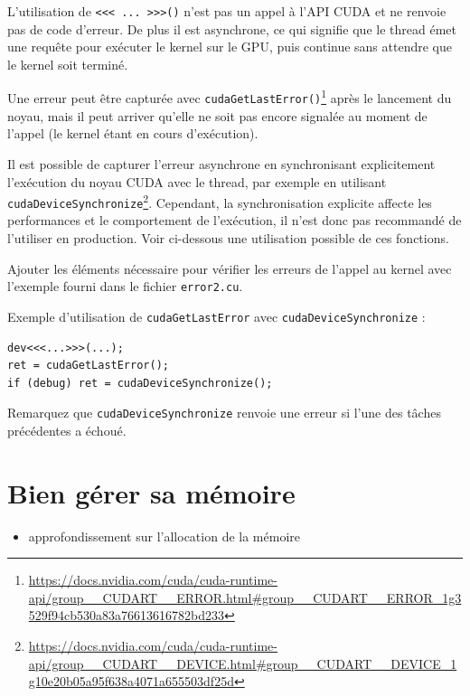 \begin{wtodo}{}

L'utilisation de {\tt {<}{<}< ... {>}{>}>()} n'est pas un appel à l'API CUDA et ne renvoie pas de code d'erreur.
De plus il est asynchrone, ce qui signifie que le thread émet une requête pour exécuter le kernel sur le GPU, puis continue sans attendre que le kernel soit terminé.

Une erreur peut être capturée avec {\tt cudaGetLastError()}\footnote{\url{https://docs.nvidia.com/cuda/cuda-runtime-api/group\_\_CUDART\_\_ERROR.html\#group\_\_CUDART\_\_ERROR\_1g3529f94cb530a83a76613616782bd233}} après le lancement du noyau, mais il peut arriver qu'elle ne soit pas encore signalée au moment de l'appel (le kernel étant en cours d'exécution).

Il est possible de capturer l'erreur asynchrone en synchronisant explicitement l'exécution du noyau CUDA avec le thread, par exemple en utilisant {\tt cudaDeviceSynchronize}\footnote{\url{https://docs.nvidia.com/cuda/cuda-runtime-api/group\_\_CUDART\_\_DEVICE.html\#group\_\_CUDART\_\_DEVICE\_1g10e20b05a95f638a4071a655503df25d}}. Cependant, la synchronisation explicite affecte les performances et le comportement de l'exécution, il n'est donc pas recommandé de l'utiliser en production. Voir ci-dessous une utilisation possible de ces fonctions.

Ajouter les éléments nécessaire pour vérifier les erreurs de l'appel au kernel avec l'exemple fourni dans le fichier {\tt error2.cu}.

\end{wtodo}

\begin{howto}{}
Exemple d'utilisation de {\tt cudaGetLastError} avec {\tt cudaDeviceSynchronize} :
\begin{verbatim}
dev<<<...>>>(...);
ret = cudaGetLastError();
if (debug) ret = cudaDeviceSynchronize();
\end{verbatim}
Remarquez que {\tt cudaDeviceSynchronize} renvoie une erreur si l'une des tâches précédentes a échoué.
\end{howto} 


  \section{Bien gérer sa mémoire}

\begin{objectif}[]{}
 \begin{itemize}
	\item approfondissement sur l'allocation de la mémoire
\end{itemize}
\end{objectif}

